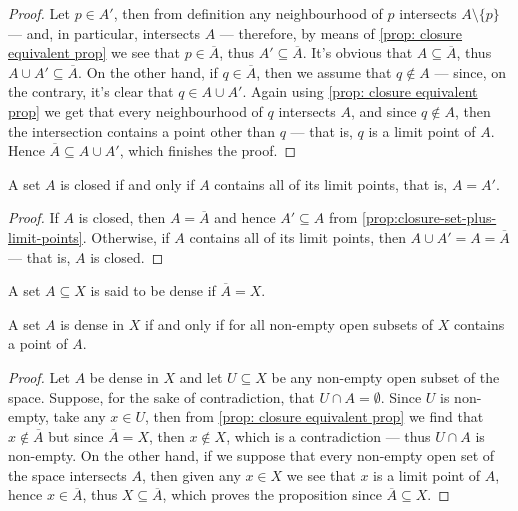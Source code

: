 \begin{proof}
Let \(p \in A'\), then from definition any neighbourhood of \(p\) intersects
\(A \setminus \{p\}\) --- and, in particular, intersects \(A\) --- therefore, by
means of \cref{prop: closure equivalent prop} we see that \(p \in
\overline{A}\), thus \(A' \subseteq \overline A\). It's obvious that \(A
\subseteq \overline{A}\), thus \(A \cup A' \subseteq \overline{A}\). On the
other hand, if \(q \in \overline{A}\), then we assume that \(q \notin A\) ---
since, on the contrary, it's clear that \(q \in A \cup A'\). Again using
\cref{prop: closure equivalent prop} we get that every neighbourhood of \(q\)
intersects \(A\), and since \(q \notin A\), then the intersection contains a
point other than \(q\) --- that is, \(q\) is a limit point of \(A\). Hence
\(\overline{A} \subseteq A \cup A'\), which finishes the proof.
\end{proof}

\begin{corollary}
\label{cor:closed-limit-points}
A set \(A\) is closed if and only if \(A\) contains all of its limit points,
that is, \(A = A'\).
\end{corollary}

\begin{proof}
If \(A\) is closed, then \(A = \overline{A}\) and hence \(A' \subseteq A\) from
\cref{prop:closure-set-plus-limit-points}. Otherwise, if \(A\) contains all of
its limit points, then \(A \cup A' = A = \overline{A}\) --- that is, \(A\) is
closed.
\end{proof}

\begin{definition}
\label{def:dense-set}
A set \(A \subseteq X\) is said to be dense if \(\overline{A} = X\).
\end{definition}

\begin{proposition}
\label{prop:dense-non-empty-intersects}
A set \(A\) is dense in \(X\) if and only if for all non-empty open subsets of
\(X\) contains a point of \(A\).
\end{proposition}

\begin{proof}
Let \(A\) be dense in \(X\) and let \(U \subseteq X\) be any non-empty
open subset of the space. Suppose, for the sake of contradiction, that \(U \cap
A = \emptyset\). Since \(U\) is non-empty, take any \(x \in U\), then from
\cref{prop: closure equivalent prop} we find that \(x \notin \overline{A}\) but
since \(\overline{A} = X\), then \(x \notin X\), which is a contradiction ---
thus \(U \cap A\) is non-empty. On the other hand, if we suppose that every
non-empty open set of the space intersects \(A\), then given any \(x \in X\) we
see that \(x\) is a limit point of \(A\), hence \(x \in \overline{A}\), thus \(X
\subseteq \overline{A}\), which proves the proposition since \(\overline{A}
\subseteq X\).
\end{proof}
